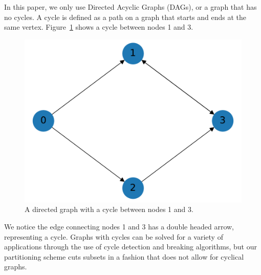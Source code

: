 \documentclass[times,final]{elsarticle}
\begin{document}
In this paper, we only use Directed Acyclic Graphs (DAGs), or a graph that has no cycles.  A cycle is defined as a path on a graph that starts and ends at the same vertex. Figure~\ref{cycle_example} shows a cycle between nodes 1 and 3.
\begin{figure}[H]
\centering
\includegraphics[scale=0.5]{../figures/cycle_example.pdf}
\caption{A directed graph with a cycle between nodes 1 and 3.}
\label{cycle_example}
\end{figure}
We notice the edge connecting nodes 1 and 3 has a double headed arrow, representing a cycle.
Graphs with cycles can be solved for a variety of applications through the use of cycle detection and breaking algorithms, but our partitioning scheme cuts subsets in a fashion that does not allow for cyclical graphs.
\end{document}
